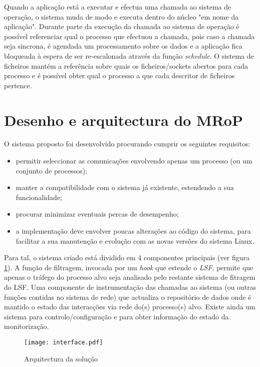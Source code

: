 Quando a aplicação está a executar e efectua uma chamada ao sistema de operação, o sistema muda de modo e executa dentro do núcleo "em nome da aplicação".
 Durante parte da execução da chamada ao sistema de operação é possível referenciar qual o processo que efectuou a chamada, pois caso a chamada seja sincrona, é agendada um processamento sobre os dados e a aplicação fica bloqueada à espera de ser re-escalonada através da função \textit{schedule}.
 O sistema de ficheiros mantém a referência sobre quais os ficheiros/sockets abertos para cada processo e é possível obter qual o processo a que cada descritor de ficheiros pertence. %

\section{Desenho e arquitectura do MRoP}
\label{sec:mrop_architecture}

O sistema proposto foi desenvolvido procurando cumprir os seguintes requisitos:
\begin{itemize}
\item permitir seleccionar as comunicações envolvendo apenas um processo (ou um conjunto de processos);
\item manter a compatibilidade com o sistema já existente, estendendo a sua funcionalidade;
\item procurar minimizar eventuais percas de desempenho;
\item a implementação deve envolver poucas alterações ao código do sistema, para facilitar a sua manutenção e evolução com as novas versões do sistema Linux.
\end{itemize}

Para tal, o sistema criado está dividido em 4 componentes principais (ver figura \ref{arquitectura}).
A função de filtragem, invocada por um \textit{hook} que estende o \textit{LSF}, permite que apenas o tráfego do processo alvo seja analisado pelo restante sistema de fitragem do LSF.
Uma componente de instrumentação das chamadas ao sistema (ou outras funções contidas no sistema de rede) que actualiza o repositório de dados onde é mantido o estado das interacções via rede do(s) processo(s) alvo.
Existe ainda um sistema para controlo/configuração e para obter informação do estado da monitorização.

\begin{figure}[htbp]
\begin{center}
\texttt{[image: interface.pdf]} 
\caption{Arquitectura da solução}
\label{arquitectura}
\end{center}
\end{figure}



